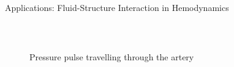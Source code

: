 \documentclass[final,utf8,,hyperref={pdfpagelabels=false}]{beamer}
\begin{document}
\begin{frame}[containsverbatim]{}
\begin{columns}[c]
\begin{block}{Applications: Fluid-Structure Interaction in Hemodynamics}
\begin{columns}[t]
\begin{column}{.40\textwidth}
\begin{figure}
\begin{minipage}[b]{0.6\linewidth}
	   \vspace{0.5cm}\\
	\end{minipage}
	\begin{minipage}[t]{0.25\linewidth}
	  \centering
	\end{minipage}
	\caption{Pressure pulse travelling through the artery}
	\label{pressure_wave}
	\end{figure}



\end{column}
\end{columns}
\end{block}
\end{columns}
\end{frame}
\end{document}
